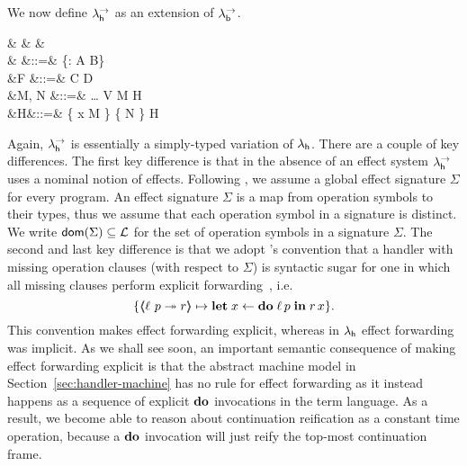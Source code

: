 \documentclass[12pt,phd,lfcs,twoside,openright,logo,leftchapter,normalheadings]{infthesis}
\theoremstyle{plain}
\theoremstyle{definition}
\begin{document}
We now define $\lambda^\rightarrow_{\mathsf{h}}$ as an extension of $\lambda^\rightarrow_{\mathsf{b}}$.
%
{
\begin{syntax}
 &\ell \in {} & & \\
        &\Sigma\in{} &::=& \cdot \mid \{\ell : A \to B\} \cup \Sigma\\
     &F \in \HandlerTypeCat    &::=& C \Rightarrow D\\
 &M, N \in \CompCat &::=& \dots \mid \Do \; \ell \; V
                          \mid  \Handle \; M \; \With \; H \\
     &H&::=& \{ \Return \; x \mapsto M \}
                      \mid  \{  \mapsto N \} \uplus H\\
\end{syntax}}%
%
Again, $\lambda^\rightarrow_{\mathsf{h}}$ is essentially a simply-typed variation of $\lambda_{\mathsf{h}}$.
%
There are a couple of key differences. The first key difference is
that in the absence of an effect system $\lambda^\rightarrow_{\mathsf{h}}$ uses a nominal notion
of effects. Following \citet{Pretnar15}, we assume a global effect
signature $\Sigma$ for every program.
%
An effect signature $\Sigma$ is a map from operation symbols to their
types, thus we assume that each operation symbol in a signature is
distinct.%
%
We write $\mathsf{dom}(\Sigma) \subseteq \mathcal{L}$ for the set of operation
symbols in a signature $\Sigma$.
%
%
%
The second and last key difference is that we adopt
\citeauthor{PlotkinP13}'s convention that a handler with missing
operation clauses (with respect to $\Sigma$) is syntactic sugar for
one in which all missing clauses perform explicit
forwarding~\cite{PlotkinP13}, i.e.
%
\[
   \{\langle\!\!\langle \ell~p \twoheadrightarrow r \rangle\!\!\rangle \mapsto \mathbf{let}\; x \leftarrow \mathbf{do} \; \ell \, p \;\mathbf{in}\; r \, x\}.
\]
%
This convention makes effect forwarding explicit, whereas in $\lambda_{\mathsf{h}}$
effect forwarding was implicit. As we shall see soon, an important
semantic consequence of making effect forwarding explicit is that the
abstract machine model in Section~\ref{sec:handler-machine} has no
rule for effect forwarding as it instead happens as a sequence of
explicit $\mathbf{do}$ invocations in the term language. As a result, we
become able to reason about continuation reification as a constant
time operation, because a $\mathbf{do}$ invocation will just reify the
top-most continuation frame.\medskip
\end{document}
